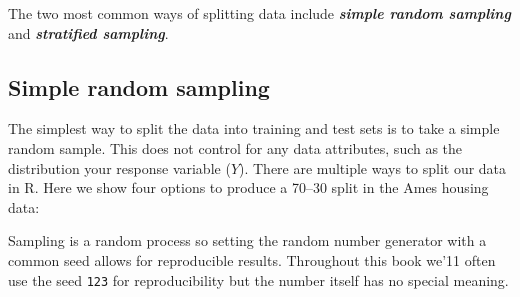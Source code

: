 \documentclass[]{krantz}
\makeatletter
\newenvironment{kframe}{%
\medskip{}
\setlength{\fboxsep}{.8em}
 \def\at@end@of@kframe{}%
 \ifinner\ifhmode%
  \def\at@end@of@kframe{\end{minipage}}%
  \begin{minipage}{\columnwidth}%
 \fi\fi%
 \def\FrameCommand##1{\hskip\@totalleftmargin \hskip-\fboxsep
 \colorbox{shadecolor}{##1}\hskip-\fboxsep
     \hskip-\linewidth \hskip-\@totalleftmargin \hskip\columnwidth}%
 \MakeFramed {\advance\hsize-\width
   \@totalleftmargin\z@ \linewidth\hsize
   \@setminipage}}%
 {\par\unskip\endMakeFramed%
 \at@end@of@kframe}
\newenvironment{block}[1]
  {
  \begin{itemize}
  \renewcommand{\labelitemi}{
    \raisebox{-.7\height}[0pt][0pt]{
      {\setkeys{Gin}{width=3em,keepaspectratio}\texttt{[image: icons/\#1]}}
    }
  }
  \setlength{\fboxsep}{1em}
  \begin{kframe}
  \item
  }
  {
  \end{kframe}
  \end{itemize}
  }
\newenvironment{note}
  {\begin{block}{note}}
  {\end{block}}
\makeatother
\begin{document}
The two most common ways of splitting data include \textbf{\emph{simple random sampling}} and \textbf{\emph{stratified sampling}}.

\hypertarget{simple-random-sampling}{%
\subsection{Simple random sampling}\label{simple-random-sampling}}

The simplest way to split the data into training and test sets is to take a simple random sample. This does not control for any data attributes, such as the distribution your response variable (\(Y\)). There are multiple ways to split our data in R. Here we show four options to produce a 70--30 split in the Ames housing data:

\begin{note}
Sampling is a random process so setting the random number generator with
a common seed allows for reproducible results. Throughout this book
we'11 often use the seed \texttt{123} for reproducibility but the number
itself has no special meaning.
\end{note}
\end{document}
